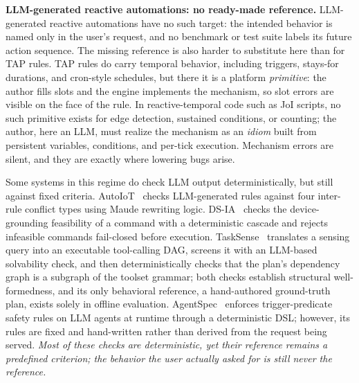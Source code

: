 \documentclass[sigconf,nonacm,anonymous,review]{acmart}
\begin{document}
\textbf{LLM-generated reactive automations: no ready-made reference.} LLM-generated reactive automations have no such target: the intended behavior is named only in the user's request, and no benchmark or test suite labels its future action sequence. The missing reference is also harder to substitute here than for TAP rules. TAP rules do carry temporal behavior, including triggers, stays-for durations, and cron-style schedules, but there it is a platform \emph{primitive}: the author fills slots and the engine implements the mechanism, so slot errors are visible on the face of the rule. In reactive-temporal code such as JoI scripts, no such primitive exists for edge detection, sustained conditions, or counting; the author, here an LLM, must realize the mechanism as an \emph{idiom} built from persistent variables, conditions, and per-tick execution. Mechanism errors are silent, and they are exactly where lowering bugs arise.

Some systems in this regime do check LLM output deterministically, but still against fixed criteria. AutoIoT~\cite{autoiot_maude} checks LLM-generated rules against four inter-rule conflict types using Maude rewriting logic. DS-IA~\cite{dsia} checks the device-grounding feasibility of a command with a deterministic cascade and rejects infeasible commands fail-closed before execution. TaskSense~\cite{tasksense} translates a sensing query into an executable tool-calling DAG, screens it with an LLM-based solvability check, and then deterministically checks that the plan's dependency graph is a subgraph of the toolset grammar; both checks establish structural well-formedness, and its only behavioral reference, a hand-authored ground-truth plan, exists solely in offline evaluation. AgentSpec~\cite{agentspec} enforces trigger-predicate safety rules on LLM agents at runtime through a deterministic DSL; however, its rules are fixed and hand-written rather than derived from the request being served. \emph{Most of these checks are deterministic, yet their reference remains a predefined criterion; the behavior the user actually asked for is still never the reference.}
\end{document}
